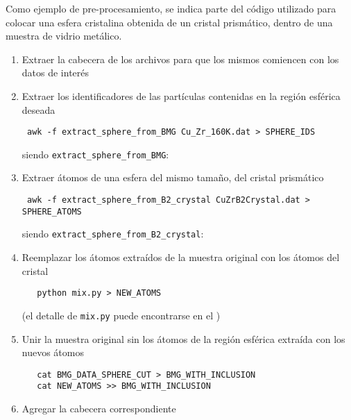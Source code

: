 Como ejemplo de pre-procesamiento, se indica parte del código utilizado para colocar una esfera cristalina obtenida de un cristal prismático, dentro de una muestra de vidrio metálico.

\begin{enumerate}
 \item Extraer la cabecera de los archivos para que los mismos  comiencen con los datos de interés
 \item Extraer los identificadores de las partículas contenidas en la región esférica deseada \\
 \begin{lstlisting}
 awk -f extract_sphere_from_BMG Cu_Zr_160K.dat > SPHERE_IDS
  \end{lstlisting}
  siendo \lstinline[language=bash]|extract_sphere_from_BMG|:\\  
 
 \item Extraer átomos de una esfera del mismo tamaño, del cristal prismático \\
  \begin{lstlisting}
 awk -f extract_sphere_from_B2_crystal CuZrB2Crystal.dat > SPHERE_ATOMS
  \end{lstlisting}
  siendo \lstinline[language=bash]|extract_sphere_from_B2_crystal|:\\  
  
  \item Reemplazar los átomos extraídos de la muestra original con los átomos del cristal \\
  \begin{lstlisting}
   python mix.py > NEW_ATOMS
  \end{lstlisting}
  (el detalle de \lstinline[language=bash]|mix.py| puede encontrarse en el  )
  \item Unir la muestra original sin los átomos de la región esférica extraída con los nuevos átomos \\  
  \begin{lstlisting}
   cat BMG_DATA_SPHERE_CUT > BMG_WITH_INCLUSION
   cat NEW_ATOMS >> BMG_WITH_INCLUSION
  \end{lstlisting}
  \item Agregar la cabecera correspondiente
\end{enumerate}


